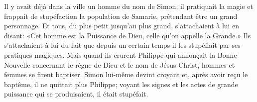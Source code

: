 Il y avait déjà dans la ville un homme du nom de Simon;
	il pratiquait la magie et frappait de stupéfaction la population de Samarie,
	prétendant être un grand personnage.
Et tous, du plus petit jusqu’au plus grand, s’attachaient à lui en disant:
	«Cet homme est la Puissance de Dieu, celle qu’on appelle la Grande.»
Ils s’attachaient à lui du fait que depuis un certain temps
	il les stupéfiait par ses pratiques magiques.
Mais quand ils crurent Philippe
	qui annonçait la Bonne Nouvelle concernant le règne de Dieu et le nom de Jésus Christ,
	hommes et femmes se firent baptiser.
Simon lui-même devint croyant et, après avoir reçu le baptême,
	il ne quittait plus Philippe;
	voyant les signes et les actes de grande puissance qui se produisaient,
	il était stupéfait.
